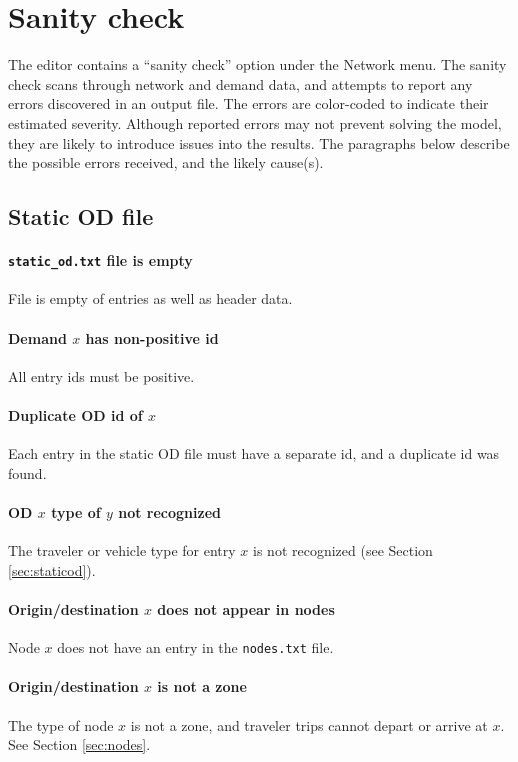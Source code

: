 \section{Sanity check}

The editor contains a ``sanity check'' option under the Network menu. The sanity check scans through network and demand data, and attempts to report any errors discovered in an output file. The errors are color-coded to indicate their estimated severity. Although reported errors may not prevent solving the model, they are likely to introduce issues into the results. The paragraphs below describe the possible errors received, and the likely cause(s).

\subsection{Static OD file}

\paragraph*{\texttt{static\_od.txt} file is empty}
File is empty of entries as well as header data.

\paragraph*{Demand $x$ has non-positive id}
All entry ids must be positive.

\paragraph*{Duplicate OD id of $x$}
Each entry in the static OD file must have a separate id, and a duplicate id was found.

\paragraph*{OD $x$ type of $y$ not recognized}
The traveler or vehicle type for entry $x$ is not recognized (see Section \ref{sec:staticod}).

\paragraph*{Origin/destination $x$ does not appear in nodes}
Node $x$ does not have an entry in the \texttt{nodes.txt} file.

\paragraph*{Origin/destination $x$ is not a zone}
The type of node $x$ is not a zone, and traveler trips cannot depart or arrive at $x$. See Section \ref{sec:nodes}.

